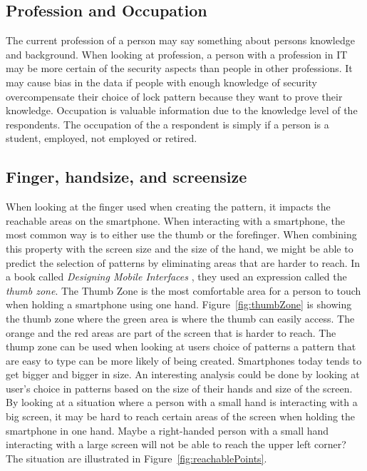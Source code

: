       \subsection*{Profession and Occupation}
      The current profession of a person may say something about persons knowledge and background. When looking at profession, a person with a profession in IT may be more certain of the security aspects than people in other professions. It may cause bias in the data if people with enough knowledge of security overcompensate their choice of lock pattern because they want to prove their knowledge. Occupation is valuable information due to the knowledge level of the respondents. The occupation of the a respondent is simply if a person is a student, employed, not employed or retired.

      \subsection*{Finger, handsize, and screensize}
      When looking at the finger used when creating the pattern, it impacts the reachable areas on the smartphone. When interacting with a smartphone, the most common way is to either use the thumb or the forefinger. When combining this property with the screen size and the size of the hand, we might be able to predict the selection of patterns by eliminating areas that are harder to reach. In a book called {\it Designing Mobile Interfaces} \cite{Hoober}, they used an expression called the {\it thumb zone}. The Thumb Zone is the most comfortable area for a person to touch when holding a smartphone using one hand. Figure~\ref{fig:thumbZone} is showing the thumb zone where the green area is where the thumb can easily access. The orange and the red areas are part of the screen that is harder to reach. The thump zone can be used when looking at users choice of patterns a pattern that are easy to type can be more likely of being created. Smartphones today tends to get bigger and bigger in size. An interesting analysis could be done by looking at user's choice in patterns based on the size of their hands and size of the screen. By looking at a situation where a person with a small hand is interacting with a big screen, it may be hard to reach certain areas of the screen when holding the smartphone in one hand. Maybe a right-handed person with a small hand interacting with a large screen will not be able to reach the upper left corner? The situation are illustrated in Figure~\ref{fig:reachablePoints}.

